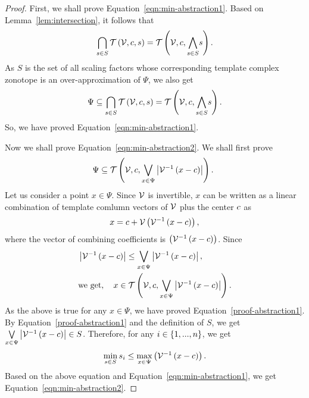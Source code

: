 \begin{proof}
  First, we shall prove Equation~\ref{eqn:min-abstraction1}.
Based on Lemma~\ref{lem:intersection}, it follows that
%
\[
\bigcap_{s\in
S}\mathit{\operatorname{\mathcal{T}}}\left(\mathcal{V},c,s\right)=\mathit{\operatorname{\mathcal{T}}}\left(\mathcal{V},c,\underset{s\in
S}{\bigwedge}s\right).
\]
%
As $S$ is the set of all scaling factors
whose corresponding template complex zonotope is an over-approximation
of $\Psi$, we also get
%
\[
\Psi\subseteq\bigcap_{s\in
  S}\mathit{\operatorname{\mathcal{T}}}\left(\mathcal{V},c,s\right)=\mathit{\operatorname{\mathcal{T}}}\left(\mathcal{V},c,\underset{s\in
  S}{\bigwedge}s\right).
\]
%
So, we have proved Equation~\ref{eqn:min-abstraction1}.

Now we shall prove Equation~\ref{eqn:min-abstraction2}.  We shall
first prove
%
\begin{equation}
  \Psi\subseteq\mathit{\operatorname{\mathcal{T}}}\left(\mathcal{V},c,\underset{x\in \Psi}{\bigvee}\left|{\mathcal{V}}^{-1}\left(x-c\right)\right|\right).~\label{proof-abstraction1}
\end{equation}
%
Let us
consider a point $x\in\Psi$.  Since $\mathcal{V}$ is invertible, $x$ can be
written as a linear combination of template comlumn vectors
of $\mathcal{V}$ plus the center $c$ as
\[x=c+\mathcal{V}\left({\mathcal{V}}^{-1}\left(x-c\right)\right),\] where the vector of
combining coefficients is $\left({\mathcal{V}}^{-1}\left(x-c\right)\right)$.  Since
%
\begin{align*}
& \left|{\mathcal{V}}^{-1}\left(x-c\right)\right|\leq\underset{x\in \Psi}{\bigvee}\left|{\mathcal{V}}^{-1}\left(x-c\right)\right|,\\
  & \text{we get},\hspace{1em} x\in\mathit{\operatorname{\mathcal{T}}}\left(\mathcal{V},c,\underset{x\in \Psi}{\bigvee}\left|{\mathcal{V}}^{-1}\left(x-c\right)\right|\right).
\end{align*}
%
As the above is true for any $x\in\Psi$, we have proved
Equation~\ref{proof-abstraction1}.  By
Equation~\ref{proof-abstraction1} and the definition of $S$,
we get $\underset{x\in
  \Psi}{\bigvee}\left|{\mathcal{V}}^{-1}\left(x-c\right)\right|\in S$.  Therefore, for any
$i\in\left\{1,...,n\right\}$, we get
%
\[
\min_{s\in S}s_i\leq\max_{x\in\Psi}\left({\mathcal{V}}^{-1}\left(x-c\right)\right).
\]
%
Based on the above equation and Equation~\ref{eqn:min-abstraction1},
we get Equation~\ref{eqn:min-abstraction2}.
\end{proof}

